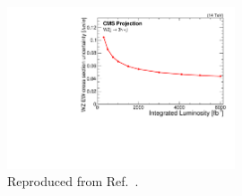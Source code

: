 \begin{figure}[htbp]
  \centering
   \includegraphics[width=0.6\textwidth]{figures/Conclusions/WZjjSignficanceHLLHC.pdf}
  \caption{
    Reproduced from Ref.~\cite{CMS-PAS-FTR-18-038}.
        }
 \label{fig:WZHLLHC}
\end{figure}
